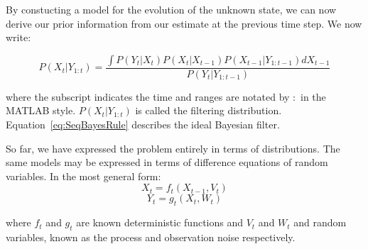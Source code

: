 By constucting a model for the evolution of the unknown state, we can now derive our prior information from our estimate at the previous time step. We now write:

\begin{equation}
P(X_t|Y_{1:t}) = \frac{\int P(Y_t|X_t)P(X_t|X_{t-1})P(X_{t-1}|Y_{1:t-1}) dX_{t-1}}{P(Y_t|Y_{1:t-1})}
\label{eq:SeqBayesRule}
\end{equation}

where the subscript indicates the time and ranges are notated by $:$ in the MATLAB style. $P(X_t|Y_{1:t})$ is called the filtering distribution. Equation~\ref{eq:SeqBayesRule} describes the ideal Bayesian filter.




So far, we have expressed the problem entirely in terms of distributions. The same models may be expressed in terms of difference equations of random variables. In the most general form:
\begin{equation}
X_t = f_t(X_{t-1}, V_t)
\label{eq:FilterEq1}
\end{equation}
\begin{equation}
Y_t = g_t(X_t, W_t)
\label{eq:FilterEq2}
\end{equation}

where $f_t$ and $g_t$ are known deterministic functions and $V_t$ and $W_t$ and random variables, known as the process and observation noise respectively.